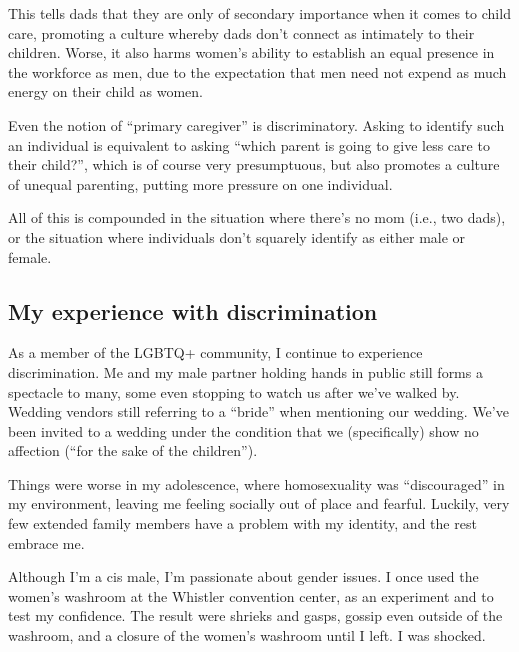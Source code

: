 \documentclass[]{article}
\begin{document}
This tells dads that they are only of secondary importance when it comes to child care, promoting a culture whereby dads don't connect as intimately to their children. Worse, it also harms women's ability to establish an equal presence in the workforce as men, due to the expectation that men need not expend as much energy on their child as women.

Even the notion of ``primary caregiver'' is discriminatory. Asking to identify such an individual is equivalent to asking ``which parent is going to give less care to their child?'', which is of course very presumptuous, but also promotes a culture of unequal parenting, putting more pressure on one individual.

All of this is compounded in the situation where there's no mom (i.e., two dads), or the situation where individuals don't squarely identify as either male or female.

\hypertarget{my-experience-with-discrimination}{%
\subsection{My experience with discrimination}\label{my-experience-with-discrimination}}

As a member of the LGBTQ+ community, I continue to experience discrimination. Me and my male partner holding hands in public still forms a spectacle to many, some even stopping to watch us after we've walked by. Wedding vendors still referring to a ``bride'' when mentioning our wedding. We've been invited to a wedding under the condition that we (specifically) show no affection (``for the sake of the children'').

Things were worse in my adolescence, where homosexuality was ``discouraged'' in my environment, leaving me feeling socially out of place and fearful. Luckily, very few extended family members have a problem with my identity, and the rest embrace me.

Although I'm a cis male, I'm passionate about gender issues. I once used the women's washroom at the Whistler convention center, as an experiment and to test my confidence. The result were shrieks and gasps, gossip even outside of the washroom, and a closure of the women's washroom until I left. I was shocked.
\end{document}
